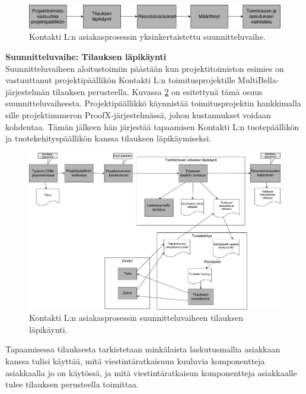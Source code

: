 \documentclass[finnish,12pt,a4paper,pdftex]{article}
\begin{document}
\begin{figure}[!h]
    \centering
    \includegraphics[scale=0.35]{images/ykssuunn.pdf}
    \caption{Kontakti L:n asiakasprosessin yksinkertaistettu suunnitteluvaihe.}
    \label{fig:ykssuun}
\end{figure}


\textbf{Suunnitteluvaihe: Tilauksen läpikäynti}\\

\noindent Suunnitteluvaiheen aloitustoimiin päästään kun projektitoimiston esimies on vastuuttanut projektipäällikön Kontakti L:n toimitusprojektille MultiBella-järjestelmän tilauksen perusteella. Kuvassa \ref{fig:aloitustoimet} on esitettynä tämä osuus suunnitteluvaiheesta. Projektipäällikkö käynnistää toimitusprojektin hankkimalla sille projektinumeron ProofX-järjestelmässä, johon kustannukset voidaan kohdentaa. Tämän jälkeen hän järjestää tapaamisen Kontakti L:n tuotepäällikön ja tuotekehityspäällikön kanssa tilauksen läpikäymiseksi. \\

\begin{figure}[!h]
    \centering
    \includegraphics[scale=0.3]{images/aloitus.pdf}
    \caption{Kontakti L:n asiakasprosessin suunnitteluvaiheen tilauksen läpikäynti.}
    \label{fig:aloitustoimet}
\end{figure}

\noindent Tapaamisessa tilauksesta tarkistetaan minkälaista laskutusmallia asiakkaan kanssa tulisi käyttää, mitä viestintäratkaisuun kuuluvia komponentteja asiakkaalla jo on käytössä, ja mitä viestintäratkaisun komponentteja asiakkaalle tulee tilauksen perusteella toimittaa.\\
\end{document}
